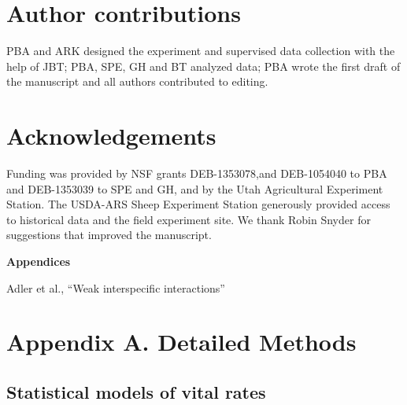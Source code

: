 \documentclass[11pt]{article}
\begin{document}
\begin{doublespacing}
\section*{Author contributions}

PBA and ARK designed the experiment and supervised data collection with the help of JBT; PBA, SPE, GH and BT analyzed data; PBA wrote the first draft of the manuscript and all authors contributed to editing.

\section*{Acknowledgements}

Funding was provided by NSF grants DEB-1353078,and  DEB-1054040 to PBA and DEB-1353039 to SPE and GH, and by the Utah Agricultural Experiment Station. The USDA-ARS Sheep Experiment Station generously provided access to historical data and the field experiment site.  We thank Robin Snyder for suggestions that improved the manuscript.





\end{doublespacing} 


\clearpage 
\newpage 

\setcounter{page}{1}
\setcounter{equation}{0}
\setcounter{figure}{0}
\setcounter{section}{0}
\setcounter{table}{0}
\renewcommand{\theequation}{A-\arabic{equation}}
\renewcommand{\thetable}{B-\arabic{table}}
\renewcommand{\thefigure}{C-\arabic{figure}}
\renewcommand{\thesection}{A.\arabic{section}}

\centerline{\Large \textbf{Appendices}}
\centerline{Adler et al., ``Weak interspecific interactions''} 

\vspace{0.4in} 

\section*{Appendix A. Detailed Methods} \label{suppMethods}

\subsection*{Statistical models of vital rates}
\end{document}
